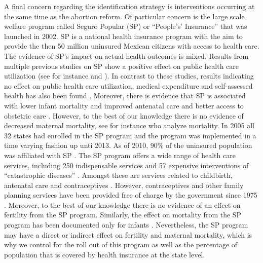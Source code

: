 \documentclass[a4paper, 11pt]{article}
\begin{document}
\begin{spacing}{1.4}
A final concern regarding the identification strategy is interventions occurring at the
same time as the abortion reform. Of particular concern is the large scale welfare
program called Seguro Popular (SP) or ``People's' Insurance'' that was launched in 2002.
SP is a national health insurance program with the aim to provide the then 50 million
uninsured Mexican citizens with access to health care.  The evidence of SP's impact on
actual health outcomes is mixed. Results from multiple previous studies on SP show a
positive effect on public health care utilization (see for instance
\citet{knox_health_2008} and \cite{barros2008wealthier}). In contrast to these studies,
results indicating no effect on public health care utilization, medical expenditure and
self-assessed health has also been found \cite{king2009public}. Moreover, there is
evidence that SP is associated with lower infant mortality and improved antenatal care
\citep{conti2014evaluating} and better access to obstetric care
\citep{sosa2009heterogeneous}. However, to the best of our knowledge there is no
evidence of decreased maternal mortality, see for instance \citep{conti2014evaluating}
who analyze mortality. In 2005 all 32 states had enrolled in the SP program
\citep{Knauletal2007} and the program was implemented in a time varying fashion up unti
2013.  As of 2010, 90\% of the uninsured population was affiliated with SP
\citep{bosch2012taking}. The SP program offers a wide range of health care services,
including 250 indispensable services and 57 expensive interventions of ``catastrophic
diseases'' \citep{Darney2015}. Amongst these are services related to childbirth,
antenatal care \citep{knox_health_2008} and contraceptives \citep{Darney2015}. However,
contraceptives and other family planning services have been provided free of charge by
the government since 1975 \citep{GIRE2009}. Moreover, to the best of our knowledge there
is no evidence of an effect on fertility from the SP program. Similarly, the effect on
mortality from the SP program has been documented only for infants \citep{conti2014evaluating}.
Nevertheless, the SP program may have a direct or indirect effect on fertility and
maternal mortality, which is why we control for the roll out of this program as well
as the percentage of population that is covered by health insurance at the state level.
 

\end{spacing}
\end{document}

